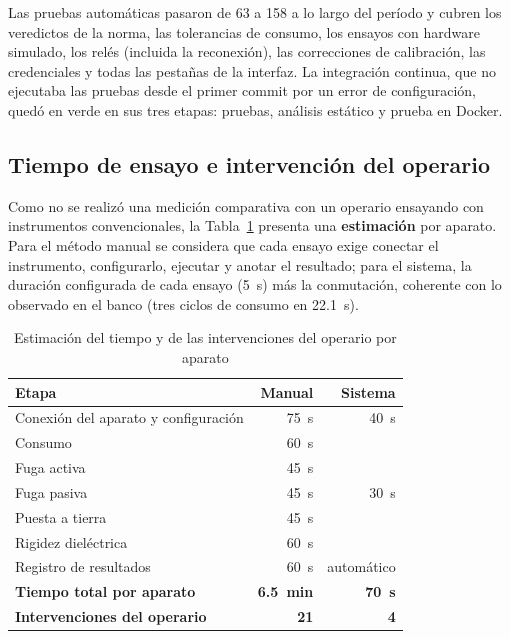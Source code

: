 Las pruebas automáticas pasaron de 63 a 158 a lo largo del período y cubren los
veredictos de la norma, las tolerancias de consumo, los ensayos con hardware
simulado, los relés (incluida la reconexión), las correcciones de calibración, las
credenciales y todas las pestañas de la interfaz. La integración continua, que no
ejecutaba las pruebas desde el primer commit por un error de configuración, quedó
en verde en sus tres etapas: pruebas, análisis estático y prueba en Docker.

\subsection{Tiempo de ensayo e intervención del operario}
\label{subsec:resultados_tiempos}

Como no se realizó una medición comparativa con un operario ensayando con
instrumentos convencionales, la Tabla~\ref{tab:tiempos} presenta una
\textbf{estimación} por aparato. Para el método manual se considera que cada
ensayo exige conectar el instrumento, configurarlo, ejecutar y anotar el
resultado; para el sistema, la duración configurada de cada ensayo
(\SI{5}{\second}) más la conmutación, coherente con lo observado en el banco
(tres ciclos de consumo en \SI{22,1}{\second}).

\begin{table}[htbp]
\centering
\caption{Estimación del tiempo y de las intervenciones del operario por aparato}
\label{tab:tiempos}
\renewcommand{\arraystretch}{1.25}
\small
\begin{tabularx}{\linewidth}{@{} X r r @{}}
\toprule
\textbf{Etapa} & \textbf{Manual} & \textbf{Sistema} \\
\midrule
Conexión del aparato y configuración          & \SI{75}{\second} & \SI{40}{\second} \\
Consumo                                       & \SI{60}{\second} & \multirow{5}{*}{\SI{30}{\second}} \\
Fuga activa                                   & \SI{45}{\second} & \\
Fuga pasiva                                   & \SI{45}{\second} & \\
Puesta a tierra                               & \SI{45}{\second} & \\
Rigidez dieléctrica                           & \SI{60}{\second} & \\
Registro de resultados                        & \SI{60}{\second} & automático \\
\midrule
\textbf{Tiempo total por aparato}             & \textbf{\SI{6,5}{\minute}}
                                              & \textbf{\SI{70}{\second}} \\
\textbf{Intervenciones del operario}          & \textbf{21} & \textbf{4} \\
\bottomrule
\end{tabularx}
\end{table}

